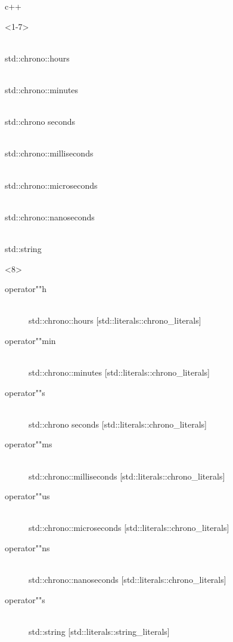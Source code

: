 \documentclass[10pt]{beamer}
\begin{document}
\begin{frame}{c++}

	\begin{onlyenv}<1-7>
	\begin{description}[<+- |alert@+>]
		\item[operator""h] \hfill \\ std::chrono::hours
		\item[operator""min] \hfill \\ std::chrono::minutes
		\item[operator""s] \hfill \\ std::chrono seconds
		\item[operator""ms] \hfill \\ std::chrono::milliseconds
		\item[operator""us] \hfill \\ std::chrono::microseconds
		\item[operator""ns] \hfill \\ std::chrono::nanoseconds
		\item[operator""s] \hfill \\ std::string
	\end{description}
	\end{onlyenv}

	\begin{onlyenv}
		\begin{description}
		\item[operator""h] \hfill \\ std::chrono::hours \hfill { \footnotesize  [std::literals::chrono\_literals] }
		\item[operator""min] \hfill \\ std::chrono::minutes \hfill { \footnotesize  [std::literals::chrono\_literals] }
		\item[operator""s] \hfill \\ std::chrono seconds \hfill { \footnotesize  [std::literals::chrono\_literals] }
		\item[operator""ms] \hfill \\ std::chrono::milliseconds \hfill { \footnotesize  [std::literals::chrono\_literals] }
		\item[operator""us] \hfill \\ std::chrono::microseconds \hfill { \footnotesize  [std::literals::chrono\_literals] }
		\item[operator""ns] \hfill \\ std::chrono::nanoseconds \hfill { \footnotesize  [std::literals::chrono\_literals] }
		\item[operator""s] \hfill \\ std::string \hfill { \footnotesize  \alert{[std::literals::string\_literals]} }
	\end{description}
	\end{onlyenv}
\end{frame}
\end{document}
